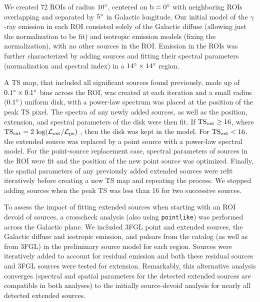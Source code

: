 We created 72 ROIs of radius ${\rm 10^{\circ}}$, centered on ${\rm b = 0^{\circ}}$ with neighboring ROIs overlapping and separated by ${\rm 5^{\circ}}$ in Galactic longitude.  Our initial model of the $\gamma$-ray emission in each ROI consisted solely of the Galactic diffuse (allowing just the normalization to be fit) and isotropic emission models (fixing the normalization), with no other sources in the ROI. Emission in the ROIs was further characterized by adding sources and fitting their spectral parameters (normalization and spectral index) in a ${\rm 14^{\circ}}\times{\rm 14^{\circ}}$ region. 

A TS map, that included all significant sources found previously, made up of ${\rm 0.1^{\circ}}\times{\rm 0.1^{\circ}}$ bins across the ROI, was created at each iteration and a small radius (${\rm 0.1^{\circ}}$) uniform disk, with a power-law spectrum was placed at the position of the peak TS pixel. The spectra of any newly added sources, as well as the position, extension, and spectral parameters of the disk were then fit. If $\rm TS_{ext} \geq 16$, where  ${\rm TS_{ext} = 2~log(\mathcal{L}_{ext} / \mathcal{L}_{ps})}$ \citep[\ie twice the log-likelihood ratio of an extended to a point source,][]{Lande12}, then the disk was kept in the model. For $\rm TS_{ext} < 16$, the extended source was replaced by a point source with a power-law spectral model. For the point-source replacement case, spectral parameters of sources in the ROI were fit and the position of the new point source was optimized. Finally, the spatial parameters of any previously added extended sources were refit iteratively before creating a new TS map and repeating the process. We stopped adding sources when the peak TS was less than 16 for two successive sources. 

{ To assess the impact of fitting extended sources when starting with an ROI devoid of sources, a crosscheck analysis (also using {\tt pointlike}) was performed across the Galactic plane. We included 3FGL point and extended sources, the Galactic diffuse and isotropic emission, and pulsars from the \twopc{} catalog \citep{2PC} (as well as from 3FGL) in the preliminary source model for each region. Sources were iteratively added to account for residual emission and both these residual sources and 3FGL  sources were tested for extension. Remarkably, this alternative analysis converges (\ie spectral and spatial parameters for the detected extended sources are compatible in both analyses) to the initially source-devoid analysis for nearly all detected extended sources.
}

